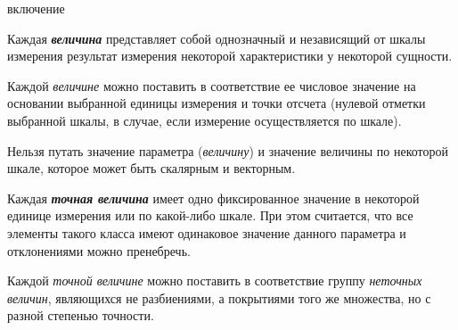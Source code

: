 \begin{SCn}
\begin{SCn}
\begin{SCn}
	
	
	

\begin{scnrelfromlist}{включение}
\end{scnrelfromlist}
\end{SCn}

Каждая \textbf{\textit{величина}} представляет собой однозначный и независящий от шкалы измерения результат измерения некоторой характеристики у некоторой сущности.
		
Каждой \textit{величине} можно поставить в соответствие ее числовое значение на основании выбранной единицы измерения и точки отсчета (нулевой отметки выбранной шкалы, в случае, если измерение осуществляется по шкале).
		
Нельзя путать значение параметра (\textit{величину}) и значение величины по некоторой шкале, которое может быть скалярным и векторным.
	
\begin{SCn}
\end{SCn}

Каждая \textbf{\textit{точная величина}} имеет одно фиксированное значение в некоторой единице измерения или по какой-либо шкале. При этом считается, что все элементы такого класса имеют одинаковое значение данного параметра и отклонениями можно пренебречь.
		
Каждой \textit{точной величине} можно поставить в соответствие группу \textit{неточных величин}, являющихся не разбиениями, а покрытиями того же множества, но с разной степенью точности.


\end{SCn}
\end{SCn}
